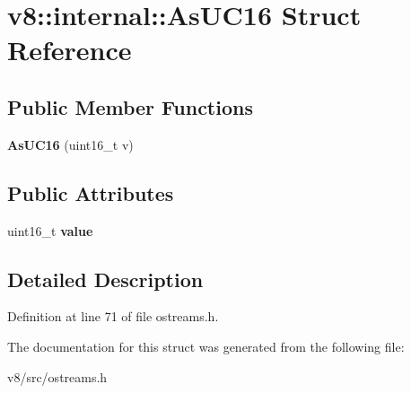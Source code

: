 \hypertarget{structv8_1_1internal_1_1AsUC16}{}\section{v8\+:\+:internal\+:\+:As\+U\+C16 Struct Reference}
\label{structv8_1_1internal_1_1AsUC16}
\subsection*{Public Member Functions}
\begin{DoxyCompactItemize}
\item 
\mbox{\label{structv8_1_1internal_1_1AsUC16_a3e5320cfba0c7a9db5b53ea51badb725}} 
{\bfseries As\+U\+C16} (uint16\+\_\+t v)
\end{DoxyCompactItemize}
\subsection*{Public Attributes}
\begin{DoxyCompactItemize}
\item 
\mbox{\label{structv8_1_1internal_1_1AsUC16_a47b40c52eca0f02200a80f480afe07d5}} 
uint16\+\_\+t {\bfseries value}
\end{DoxyCompactItemize}


\subsection{Detailed Description}


Definition at line 71 of file ostreams.\+h.



The documentation for this struct was generated from the following file\+:\begin{DoxyCompactItemize}
\item 
v8/src/ostreams.\+h\end{DoxyCompactItemize}
